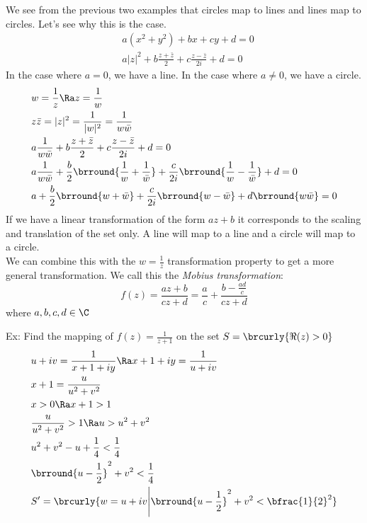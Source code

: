 We see from the previous two examples that circles map to lines and lines map to circles. Let's see why this is the case.
\begin{align*}
    &a(x^2+y^2)+bx+cy+d=0\\
    &a|z|^2+b\frac{z+\bar{z}}{2}+c\frac{z-\bar{z}}{2i}+d=0
\end{align*}
In the case where $a=0$, we have a line. In the case where $a\neq0$, we have a circle.
\begin{align*}
    &w=\frac{1}{z}\Ra z=\frac{1}{w}\\
    &z\bar{z}=|z|^2=\frac{1}{|w|^2}=\frac{1}{w\bar{w}}\\
    &a\frac{1}{w\bar{w}}+b\frac{z+\bar{z}}{2}+c\frac{z-\bar{z}}{2i}+d=0\\
    &a\frac{1}{w\bar{w}}+\frac{b}{2}\brround{\frac{1}{w}+\frac{1}{\bar{w}}}+\frac{c}{2i}\brround{\frac{1}{w}-\frac{1}{\bar{w}}}+d=0\\
    &a+\frac{b}{2}\brround{w+\bar{w}}+\frac{c}{2i}\brround{w-\bar{w}}+d\brround{w\bar{w}}=0\\
\end{align*}
If we have a linear transformation of the form $az+b$ it corresponds to the scaling and translation of the set only. A line will map to a line and a circle will map to a circle.\\
We can combine this with the $w=\frac{1}{z}$ transformation property to get a more general transformation. We call this the \textit{Mobius transformation}:
$$f(z)=\frac{az+b}{cz+d}=\frac{a}{c}+\frac{b-\tfrac{ad}{c}}{cz+d}$$
where $a,b,c,d\in\C$

Ex: Find the mapping of $f(z)=\frac{1}{z+1}$ on the set $S=\brcurly{\Re(z)>0}$ 
\begin{align*}
    &u+iv=\frac{1}{x+1+iy}\Ra x+1+iy=\frac{1}{u+iv}\\
    &x+1=\frac{u}{u^2+v^2}\\
    &x>0\Ra x+1>1\\
    &\frac{u}{u^2+v^2}>1\Ra u>u^2+v^2\\
    &u^2+v^2-u+\frac{1}{4}<\frac{1}{4}\\
    &\brround{u-\frac{1}{2}}^2+v^2<\frac{1}{4}\\
    &S'=\brcurly{w=u+iv\Bigg\vert\brround{u-\frac{1}{2}}^2+v^2<\bfrac{1}{2}^2}
\end{align*}

